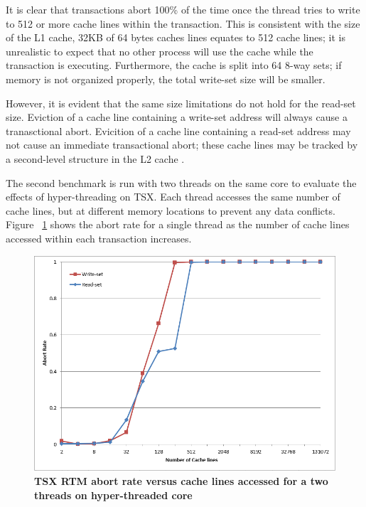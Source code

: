\documentclass[a4paper]{article}
\begin{document}
\indent It is clear that transactions abort 100\% of the time once the thread
tries to write to 512 or more cache lines within the transaction.  This is
consistent with the size of the L1 cache, 32KB of 64 bytes caches lines equates
to 512 cache lines; it is unrealistic to expect that no other process will use
the cache while the transaction is executing.  Furthermore, the cache is split
into 64 8-way sets; if memory is not organized properly, the total write-set
size will be smaller.\par

\indent However, it is evident that the same size limitations do not hold for
the read-set size.  Eviction of a cache line containing a write-set address will
always cause a tranasctional abort.  Evicition of a cache line containing a
read-set address may not cause an immediate transactional abort; these cache
lines may be tracked by a second-level structure in the L2 cache
\cite{intel_opt_man}.\par

\indent The second benchmark is run with two threads on the same core to
evaluate the effects of hyper-threading on TSX.  Each thread accesses the same
number of cache lines, but at different memory locations to prevent any data
conflicts. Figure ~\ref{fig:trx_size_ht} shows the abort rate for a single
thread as the number of cache lines accessed within each transaction
increases.\par

\begin{figure}[H]
    \centering
    \graphicspath{ {./figures/} }
    \includegraphics[width=\textwidth,height=\textheight,keepaspectratio]{trx_size_ht}
    \caption{\textbf{TSX RTM abort rate versus cache lines accessed for a two 
    threads on hyper-threaded core}}
    \label{fig:trx_size_ht}
\end{figure}
\end{document}
